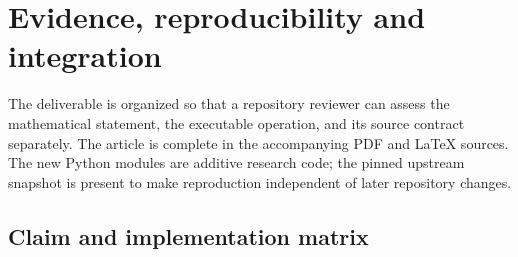 \section{Evidence, reproducibility and integration}
\label{sec:evidence}

The deliverable is organized so that a repository reviewer can assess the
mathematical statement, the executable operation, and its source contract
separately.  The article is complete in the accompanying PDF and LaTeX
sources.  The new Python modules are additive research code; the pinned
upstream snapshot is present to make reproduction independent of later
repository changes.

\subsection{Claim and implementation matrix}

